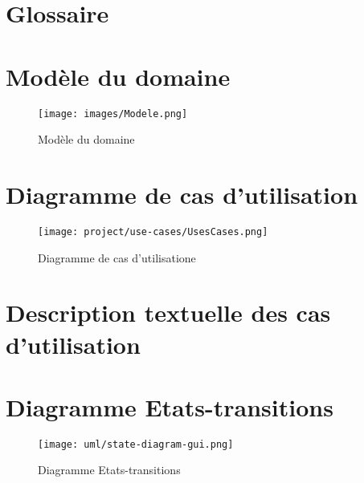 \documentclass[a4paper,10pt]{article}
\begin{document}
\begin{titlepage}
  
\end{titlepage}
\tableofcontents
\pagebreak

\section{Glossaire}
  

\FloatBarrier
\section{Modèle du domaine}
  \begin{figure}[h!]
    \begin{center}
      \texttt{[image: images/Modele.png]}
      \caption{Modèle du domaine}
      \label{fig:modele}
    \end{center}
  \end{figure}

\FloatBarrier
\section{Diagramme de cas d'utilisation}
  \begin{figure}[h!]
    \begin{center}
      \texttt{[image: project/use-cases/UsesCases.png]}
      \caption{Diagramme de cas d'utilisatione}
      \label{fig:useCase}
    \end{center}
  \end{figure}

\FloatBarrier
\section{Description textuelle des cas d’utilisation}
  
  
   

\FloatBarrier
\section{Diagramme Etats-transitions}
  \begin{figure}[h!]
    \begin{center}
      \texttt{[image: uml/state-diagram-gui.png]}
      \caption{Diagramme Etats-transitions}
      \label{fig:stateGui}
    \end{center}
  \end{figure}
\end{document}
